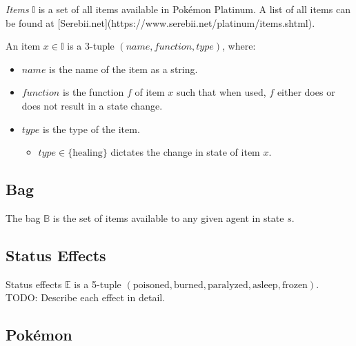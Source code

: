 \emph{Items} $\mathbb{I}$ is a set of all items available in Pokémon Platinum. A list of all items can be found at [Serebii.net](https://www.serebii.net/platinum/items.shtml).

An item $x \in \mathbb{I}$ is a 3-tuple $(name, function, type)$, where:
\begin{itemize}
    \item $name$ is the name of the item as a string.
    \item $function$ is the function $f$ of item $x$ such that when used, $f$ either does or does not result in a state change.
    \item $type$ is the type of the item.
    \begin{itemize}
        \item $type \in \{ \text{healing} \}$ dictates the change in state of item $x$.
    \end{itemize}
\end{itemize}

\subsection{Bag}

The bag $\mathbb{B}$ is the set of items available to any given agent in state $s$.

\subsection{Status Effects}

Status effects $\mathbb{E}$ is a 5-tuple $( \text{poisoned}, \text{burned}, \text{paralyzed}, \text{asleep}, \text{frozen} )$.
TODO: Describe each effect in detail.

\subsection{Pokémon}

